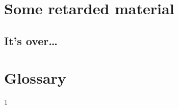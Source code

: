 \documentclass[mscthesis]{usiinfthesis}
\begin{document}
\appendix %

\chapter{Some retarded material}
\section{It's over\dots}

\backmatter

\chapter{Glossary} %

%
%



1
\end{document}
